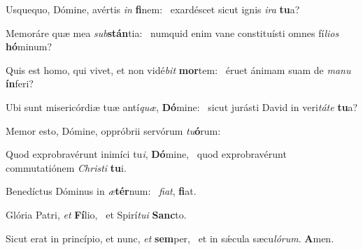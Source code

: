 \item Usquequo, Dómine, avértis \textit{in} \textbf{fi}nem:~\psstar{} exardéscet sicut ignis \textit{ira} \textbf{tu}a?

\item Memoráre quæ mea \textit{sub}\textbf{stán}tia:~\psstar{} numquid enim vane constituísti omnes fí\textit{lios} \textbf{hó}minum?

\item Quis est homo, qui vivet, et non vidé\textit{bit} \textbf{mor}tem:~\psstar{} éruet ánimam suam de \textit{manu} \textbf{ín}feri?

\item Ubi sunt misericórdiæ tuæ antí\textit{quæ}, \textbf{Dó}mine:~\psstar{} sicut jurásti David in veri\textit{táte} \textbf{tu}a?

\item Memor esto, Dómine, oppróbrii servórum \textit{tu}\textbf{ó}rum:~\psstar{}

\item Quod exprobravérunt inimíci tu\textit{i}, \textbf{Dó}mine,~\psstar{} quod exprobravérunt commutatiónem \textit{Christi} \textbf{tu}i.

\item Benedíctus Dóminus in \textit{æ}\textbf{tér}num:~\psstar{} \textit{fiat}, \textbf{fi}at.

\item Glória Patri, \textit{et} \textbf{Fí}lio,~\psstar{} et Spirí\textit{tui} \textbf{Sanc}to.

\item Sicut erat in princípio, et nunc, \textit{et} \textbf{sem}per,~\psstar{} et in sǽcula sæcu\textit{lórum}. \textbf{A}men.
